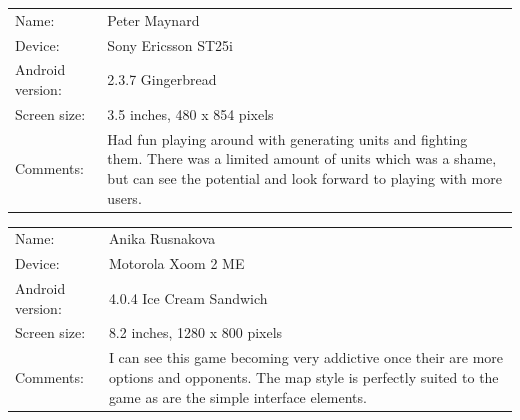 \renewcommand{\arraystretch}{1.5}
\begin{tabular}{l  p{11cm}}
	\hline
	Name: & Peter Maynard \\
	\hdashline
	Device: & Sony Ericsson ST25i \\
	\hdashline
	Android version: & 2.3.7 Gingerbread \\
	\hdashline
	Screen size: & 3.5 inches, 480 x 854 pixels \\
	\hdashline
	Comments: & Had fun playing around with generating units and fighting them. There was a limited amount of units which was a shame, but can see the potential and look forward to playing with more users. \\
	\hline
\end{tabular}

\begin{tabular}{l  p{11cm}}
	\hline
	Name: & Anika Rusnakova \\
	\hdashline
	Device: & Motorola Xoom 2 ME \\
	\hdashline
	Android version: & 4.0.4 Ice Cream Sandwich \\
	\hdashline
	Screen size: & 8.2 inches, 1280 x 800 pixels \\
	\hdashline
	Comments: & I can see this game becoming very addictive once their are more options and opponents. The map style is perfectly suited to the game as are the simple interface elements. \\
	\hline
\end{tabular}